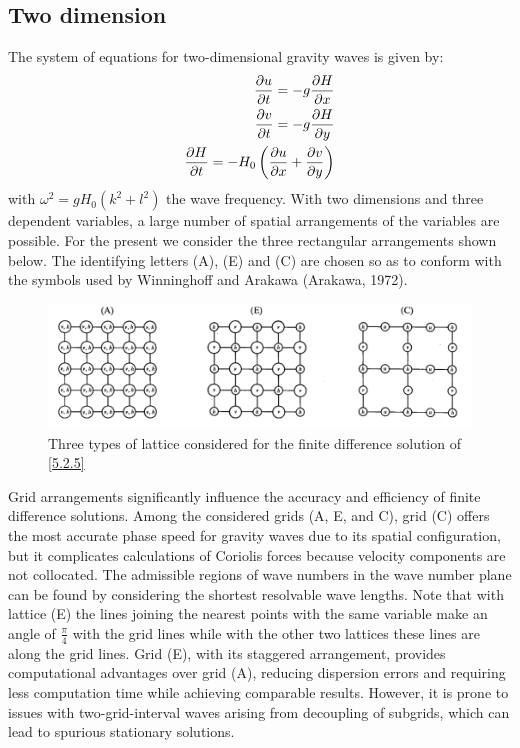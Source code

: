 \subsection{Two dimension}
The system of equations for two-dimensional gravity waves is given by:
\begin{align}\label{5.2.5}
    \frac{\partial u}{\partial t}=-g\frac{\partial H}{\partial x} \\
    \frac{\partial v}{\partial t}=-g\frac{\partial H}{\partial y} \notag \\
    \frac{\partial H}{\partial t}=-H_0\left(\frac{\partial u}{\partial x}+\frac{\partial v}{\partial y}\right)\notag
\end{align}
with $\omega^2=gH_0(k^2+l^2)$ the wave frequency.
With two dimensions and three dependent variables, a large number of spatial arrangements of the variables are possible. For the present we consider the three rectangular arrangements shown below. The identifying letters (A), (E) and (C) are chosen so as to conform with the symbols used by Winninghoff and Arakawa (Arakawa, 1972).
\begin{figure}[htbp]
    \centering
    \includegraphics[width=0.5\linewidth]{uploads/Screenshot 2024-11-14 114112.png}
    \caption{Three types of lattice considered for the finite difference solution of \ref{5.2.5}}
    \label{fig:5.2.1}
\end{figure}
Grid arrangements significantly influence the accuracy and efficiency of finite difference solutions. Among the considered grids (A, E, and C), grid (C) offers the most accurate phase speed for gravity waves due to its spatial configuration, but it complicates calculations of Coriolis forces because velocity components are not collocated. 
The admissible regions of wave numbers in the wave number plane can be found by considering the shortest resolvable wave lengths. Note that with lattice (E) the lines joining the nearest points with the same variable make an angle of $\frac{\pi}{4}$ with the grid lines while with the other two lattices these lines are along the grid lines.
Grid (E), with its staggered arrangement, provides computational advantages over grid (A), reducing dispersion errors and requiring less computation time while achieving comparable results. However, it is prone to issues with two-grid-interval waves arising from decoupling of subgrids, which can lead to spurious stationary solutions.

